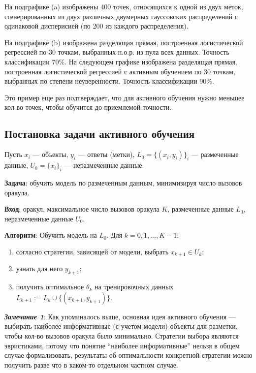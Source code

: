 \documentclass[specialist, 12pt, href]{article}
\begin{document}
На подграфике (a) изображены 400 точек, относящихся к одной из двух
меток, сгенерированных из двух различных двумерных гауссовских
распределений с одинаковой дисперисией (по 200 из каждого
распределения).

На подграфике (b) изображена разделящая прямая, построенная
логистической регрессией по 30 точкам, выбранных н.о.р. из пула всех
данных. Точность классификации 70\%. На следующем графике изображена
разделящая прямая, построенная логистической регрессией с активным
обучением по 30 точкам, выбранных по степени неуверенности. Точность
классификации 90\%.

Это пример еще раз подтверждает, что для активного обучения нужно
меньшее кол-во точек, чтобы обучится до приемлемой точности.

\subsection{Постановка задачи активного
обучения}

Пусть 
\(x_i\) --- объекты, \(y_i\) --- ответы (метки),  \(L_0 = \{(x_i, y_i)\}_i\) --- размеченные данные, \(U_0 = \{x_i\}_i\) --- неразмеченные данные. 

\textbf{Задача}: обучить модель по размеченным данным, минимизируя число вызовов оракула.

\textbf{Вход}: оракул, максимальное число вызовов
оракула \(K\), размеченные данные \(L_0\), неразмеченные данные \(U_0\).

\textbf{Алгоритм}: Обучить модель на \(L_0\). Для
\(k = 0, 1, \ldots, K - 1\):
\begin{enumerate}
\item
согласно стратегии, зависящей от модели, выбрать \(x_{k + 1} \in U_k\);
\item
узнать
для него \(y_{k + 1}\);
\item
получить оптимальное \(\theta_k\) на
тренировочных данных
\(L_{k + 1} := L_{k} \cup \{(x_{k + 1}, y_{k + 1})\}\).
\end{enumerate}

\emph{\textbf{Замечание 1}}:
Как упоминалось выше, основная идея
активного обучения --- выбирать наиболее информативные (с учетом
модели) объекты для разметки, чтобы кол-во вызовов оракула было
минимально. Стратегии выбора являются эвристиками,
потому что понятие ``наиболее информативные'' нельзя в общем случае
формализовать, результаты об оптимальности конкретной стратегии можно
получить разве что в каком-то отдельном частном случае.
\end{document}

